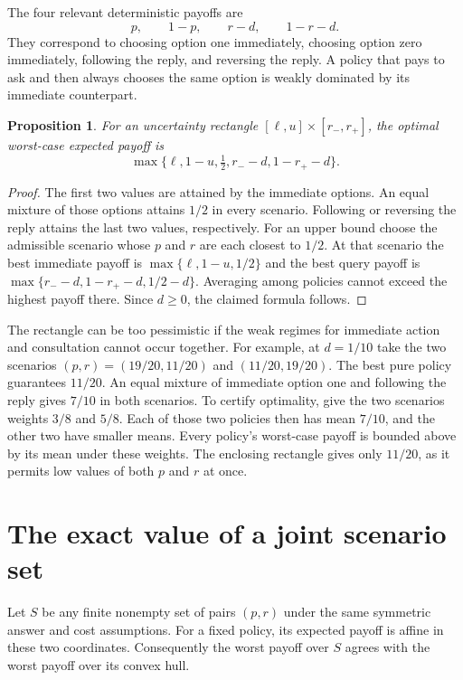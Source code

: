 \documentclass[11pt]{article}
\newtheorem{proposition}{Proposition}
\begin{document}
The four relevant deterministic payoffs are
\[
 p,\qquad 1-p,\qquad r-d,\qquad 1-r-d.
\]
They correspond to choosing option one immediately, choosing
option zero immediately, following the reply, and reversing the
reply. A policy that pays to ask and then always chooses the same
option is weakly dominated by its immediate counterpart.

\begin{proposition}
For an uncertainty rectangle $[\ell,u]\times[r_-,r_+]$, the
optimal worst-case expected payoff is
\[
 \max\bigl\{\ell,1-u,\tfrac12,r_--d,1-r_+-d\bigr\}.
\]
\end{proposition}
\begin{proof}
The first two values are attained by the immediate options. An
equal mixture of those options attains $1/2$ in every scenario.
Following or reversing the reply attains the last two values,
respectively. For an upper bound choose the admissible scenario
whose $p$ and $r$ are each closest to $1/2$. At that scenario
the best immediate payoff is $\max\{\ell,1-u,1/2\}$ and the
best query payoff is $\max\{r_--d,1-r_+-d,1/2-d\}$. Averaging
among policies cannot exceed the highest payoff there. Since
$d\ge0$, the claimed formula follows.
\end{proof}

The rectangle can be too pessimistic if the weak regimes for
immediate action and consultation cannot occur together. For
example, at $d=1/10$ take the two scenarios
$(p,r)=(19/20,11/20)$ and $(11/20,19/20)$. The best pure
policy guarantees $11/20$. An equal mixture of immediate
option one and following the reply gives $7/10$ in both scenarios.
To certify optimality, give the two scenarios weights $3/8$ and
$5/8$. Each of those two policies then has mean $7/10$, and
the other two have smaller means. Every policy's worst-case
payoff is bounded above by its mean under these weights.
The enclosing rectangle gives only $11/20$, as it permits
low values of both $p$ and $r$ at once.

\section{The exact value of a joint scenario set}
Let $S$ be any finite nonempty set of pairs $(p,r)$ under the
same symmetric answer and cost assumptions. For a fixed
policy, its expected payoff is affine in these two coordinates.
Consequently the worst payoff over $S$ agrees with the worst
payoff over its convex hull.
\end{document}
